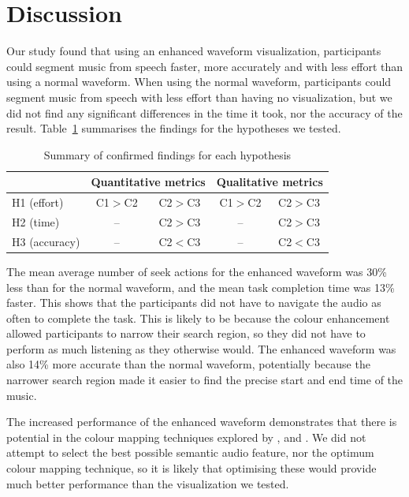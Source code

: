 \section{Discussion}\label{sec:vis-discuss}

Our study found that using an enhanced waveform visualization, participants could segment music from speech faster,
more accurately and with less effort than using a normal waveform.  When using the normal waveform, participants could
segment music from speech with less effort than having no visualization, but we did not find any significant
differences in the time it took, nor the accuracy of the result.  Table~\ref{tab:hypotheses} summarises the findings
for the hypotheses we tested.

\begin{table}[h]
  \centering
  \begin{tabular}{l | c c | c c}
    \hline
    & \multicolumn{2}{c|}{Quantitative metrics} & \multicolumn{2}{c}{Qualitative metrics} \\
    \hline
    H1 (effort)   & C1$>$C2 & C2$>$C3 & C1$>$C2 & C2$>$C3 \\
    H2 (time)     & --      & C2$>$C3 & --      & C2$>$C3 \\
    H3 (accuracy) & --      & C2$<$C3 & --      & C2$<$C3 \\
    \hline
  \end{tabular}
  \caption{Summary of confirmed findings for each hypothesis}
  \label{tab:hypotheses}
\end{table}

The mean average number of seek actions for the enhanced waveform was 30\% less than for the normal waveform, and the
mean task completion time was 13\% faster. This shows that the participants did not have to navigate the audio as often
to complete the task. This is likely to be because the colour enhancement allowed participants to narrow their search
region, so they did not have to perform as much listening as they otherwise would. The enhanced waveform was also 14\%
more accurate than the normal waveform, potentially because the narrower search region made it easier to find the
precise start and end time of the music.

The increased performance of the enhanced waveform demonstrates that there is potential in the colour mapping
techniques explored by \citet{Tzanetakis2000}, \citet{Rice2005} and \citet{Mason2007}. We did not attempt to select the
best possible semantic audio feature, nor the optimum colour mapping technique, so it is likely that optimising these
would provide much better performance than the visualization we tested.

